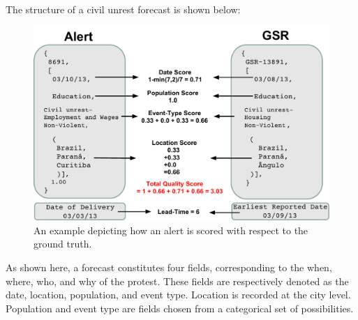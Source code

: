 The structure of a civil unrest forecast is shown below:
\begin{figure}
\includegraphics[width=\columnwidth]{figures/cu/alert_vs_gsr.pdf}
\caption{An example depicting how an alert is scored with respect to the ground truth.}
\end{figure}
As shown here, a forecast constitutes four fields, corresponding to the when, where, who, and why
of the protest. These fields are respectively denoted as the date, location, population, and event type.
Location is recorded at the city level. Population and event type are fields chosen from a categorical
set of possibilities.

